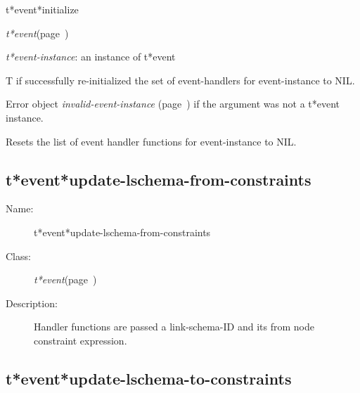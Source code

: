 \begin{description}
\item [Name:]  t*event*initialize

\item [Class:] {\sl t*event}\hfill(page~\pageref{t*event})

\item [Parameters:]
\item {\sl t*event-instance}:  an instance of t*event



\item [Return-value:]
T if successfully re-initialized the set of event-handlers
for event-instance to NIL.

Error object {\sl invalid-event-instance} (page~\pageref{invalid-event-instance}) if the argument
was not a t*event instance.

\item [Description:]

Resets the list of event handler functions for event-instance
to NIL.

\item [Public:]



\end{description}
\horizontalline

\subsection{t*event*update-lschema-from-constraints}
\label{t*event*update-lschema-from-constraints}

\begin{description}
\item [Name:]  t*event*update-lschema-from-constraints

\item [Class:] {\sl t*event}\hfill(page~\pageref{t*event})

\item [Description:]

Handler functions are passed a link-schema-ID and
its from node constraint expression.


\end{description}
\horizontalline

\subsection{t*event*update-lschema-to-constraints}
\label{t*event*update-lschema-to-constraints}

